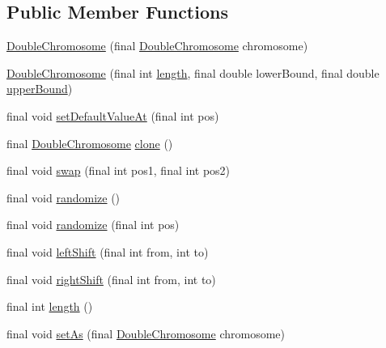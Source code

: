 \subsection*{Public Member Functions}
\begin{DoxyCompactItemize}
\item 
\hyperlink{classjenes_1_1chromosome_1_1_double_chromosome_a849079d41a2f10db681ba24de10d2619}{Double\-Chromosome} (final \hyperlink{classjenes_1_1chromosome_1_1_double_chromosome}{Double\-Chromosome} chromosome)
\item 
\hyperlink{classjenes_1_1chromosome_1_1_double_chromosome_a7166da8f71e5b0cf37e751c053f6ff5f}{Double\-Chromosome} (final int \hyperlink{classjenes_1_1chromosome_1_1_double_chromosome_a0938c891dcd64d56dcbfbc9136438b92}{length}, final double lower\-Bound, final double \hyperlink{classjenes_1_1chromosome_1_1_double_chromosome_a56362107033b220e75d83b75ea91b74e}{upper\-Bound})
\item 
final void \hyperlink{classjenes_1_1chromosome_1_1_double_chromosome_a82130d84dadedda332121b92f801d2e6}{set\-Default\-Value\-At} (final int pos)
\item 
final \hyperlink{classjenes_1_1chromosome_1_1_double_chromosome}{Double\-Chromosome} \hyperlink{classjenes_1_1chromosome_1_1_double_chromosome_ac471f6b6cb7989e6b90c5e70e7b8a9a2}{clone} ()
\item 
final void \hyperlink{classjenes_1_1chromosome_1_1_double_chromosome_ac34343c04259b0e3da8a7b2579cbd5fc}{swap} (final int pos1, final int pos2)
\item 
final void \hyperlink{classjenes_1_1chromosome_1_1_double_chromosome_a1ecf9f1d70333b8cbabdba918946cdfc}{randomize} ()
\item 
final void \hyperlink{classjenes_1_1chromosome_1_1_double_chromosome_a370f8d51fa8635eeadf925e2faf11991}{randomize} (final int pos)
\item 
final void \hyperlink{classjenes_1_1chromosome_1_1_double_chromosome_a8d8eb8ce2b20abad8d462ae87a213e85}{left\-Shift} (final int from, int to)
\item 
final void \hyperlink{classjenes_1_1chromosome_1_1_double_chromosome_ae2c6d9bac13241a8338623c612d0f70b}{right\-Shift} (final int from, int to)
\item 
final int \hyperlink{classjenes_1_1chromosome_1_1_double_chromosome_a0938c891dcd64d56dcbfbc9136438b92}{length} ()
\item 
final void \hyperlink{classjenes_1_1chromosome_1_1_double_chromosome_a7479d1ee74934b04f478dcf8fad35464}{set\-As} (final \hyperlink{classjenes_1_1chromosome_1_1_double_chromosome}{Double\-Chromosome} chromosome)

\end{DoxyCompactItemize}
